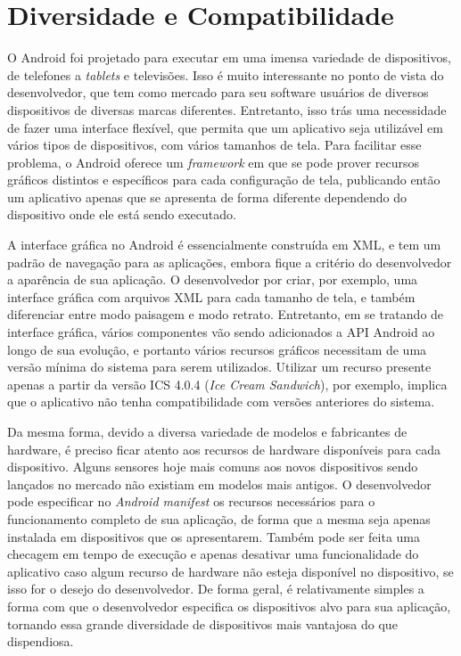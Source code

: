 \section{Diversidade e Compatibilidade}

O Android foi projetado para executar em uma imensa variedade de dispositivos, de telefones a \textit{tablets} e televisões. Isso é muito interessante no ponto de vista do desenvolvedor, que tem como mercado para seu software usuários de diversos dispositivos de diversas marcas diferentes. Entretanto, isso trás uma necessidade de fazer uma interface flexível, que permita que um aplicativo seja utilizável em vários tipos de dispositivos, com vários tamanhos de tela. Para facilitar esse problema, o Android oferece um \textit{framework} em que se pode prover recursos gráficos distintos e específicos para cada configuração de tela, publicando então um aplicativo apenas que se apresenta de forma diferente dependendo do dispositivo onde ele está sendo executado.  

A interface gráfica no Android é essencialmente construída em XML, e tem um padrão de navegação para as aplicações, embora fique a critério do desenvolvedor a aparência de sua aplicação. O desenvolvedor por criar, por exemplo, uma interface gráfica com arquivos XML para cada tamanho de tela, e também diferenciar entre modo paisagem e modo retrato. Entretanto, em se tratando de interface gráfica, vários componentes vão sendo adicionados a API Android ao longo de sua evolução, e portanto vários recursos gráficos necessitam de uma versão mínima do sistema para serem utilizados. Utilizar um recurso presente apenas a partir da versão ICS 4.0.4 (\textit{Ice Cream Sandwich}), por exemplo, implica que o aplicativo não tenha compatibilidade com versões anteriores do sistema.  

Da mesma forma, devido a diversa variedade de modelos e fabricantes de hardware, é preciso ficar atento aos recursos de hardware disponíveis para cada dispositivo. Alguns sensores hoje mais comuns aos novos dispositivos sendo lançados no mercado não existiam em modelos mais antigos. O desenvolvedor pode especificar no \textit{Android manifest} os recursos necessários para o funcionamento completo de sua aplicação, de forma que a mesma seja apenas instalada em dispositivos que os apresentarem. Também pode ser feita uma checagem em tempo de execução e apenas desativar uma funcionalidade do aplicativo caso algum recurso de hardware não esteja disponível no dispositivo, se isso for o desejo do desenvolvedor. De forma geral, é relativamente simples a forma com que o desenvolvedor especifica os dispositivos alvo para sua aplicação, tornando essa grande diversidade de dispositivos mais vantajosa do que dispendiosa. 

